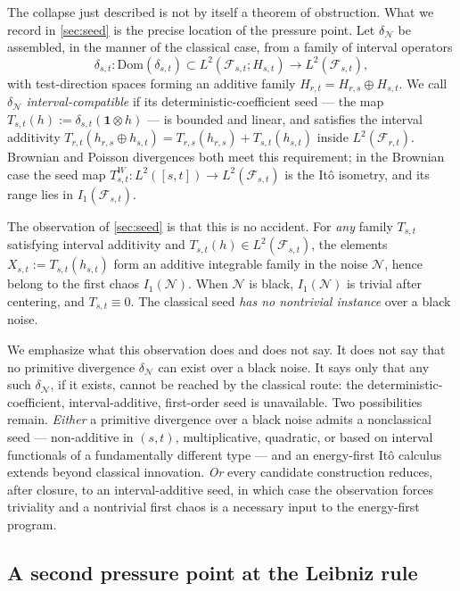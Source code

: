 \documentclass[11pt,reqno]{amsart}
\theoremstyle{plain}
\theoremstyle{definition}
\theoremstyle{remark}
\newcommand{\Dom}{\mathrm{Dom}}
\begin{document}
The collapse just described is not by itself a theorem of
obstruction. What we record in \cref{sec:seed} is the precise
location of the pressure point. Let $\delta_{\mathcal N}$ be assembled,
in the manner of the classical case, from a family of interval
operators
\[
  \delta_{s,t}\colon\Dom(\delta_{s,t})\subset L^2(\mathcal F_{s,t};H_{s,t})\to L^2(\mathcal F_{s,t}),
\]
with test-direction spaces forming an additive family
$H_{r,t}=H_{r,s}\oplus H_{s,t}$. We call $\delta_{\mathcal N}$
\emph{interval-compatible} if its deterministic-coefficient seed ---
the map $T_{s,t}(h):=\delta_{s,t}(\mathbf 1\otimes h)$ --- is bounded
and linear, and satisfies the interval additivity
$T_{r,t}(h_{r,s}\oplus h_{s,t})=T_{r,s}(h_{r,s})+T_{s,t}(h_{s,t})$
inside $L^2(\mathcal F_{r,t})$. Brownian and Poisson divergences both
meet this requirement; in the Brownian case the seed map
$T^W_{s,t}\colon L^2([s,t])\to L^2(\mathcal F_{s,t})$ is the It\^o
isometry, and its range lies in $I_1(\mathcal F_{s,t})$.

The observation of \cref{sec:seed} is that this is no accident. For
\emph{any} family $T_{s,t}$ satisfying interval additivity and
$T_{s,t}(h)\in L^2(\mathcal F_{s,t})$, the elements
$X_{s,t}:=T_{s,t}(h_{s,t})$ form an additive integrable family in
the noise $\mathcal N$, hence belong to the first chaos
$I_1(\mathcal N)$. When $\mathcal N$ is black, $I_1(\mathcal N)$ is
trivial after centering, and $T_{s,t}\equiv 0$. The classical seed
\emph{has no nontrivial instance} over a black noise.

We emphasize what this observation does and does not say. It does not
say that no primitive divergence $\delta_{\mathcal N}$ can exist over
a black noise. It says only that any such $\delta_{\mathcal N}$, if it
exists, cannot be reached by the classical route: the
deterministic-coefficient, interval-additive, first-order seed is
unavailable. Two possibilities remain. \emph{Either} a primitive
divergence over a black noise admits a nonclassical seed ---
non-additive in $(s,t)$, multiplicative, quadratic, or based on
interval functionals of a fundamentally different type --- and an
energy-first It\^o calculus extends beyond classical innovation.
\emph{Or} every candidate construction reduces, after closure, to an
interval-additive seed, in which case the observation forces
triviality and a nontrivial first chaos is a necessary input to the
energy-first program.

\subsection{A second pressure point at the Leibniz rule}\label{sec:intro-leibniz}
\end{document}
